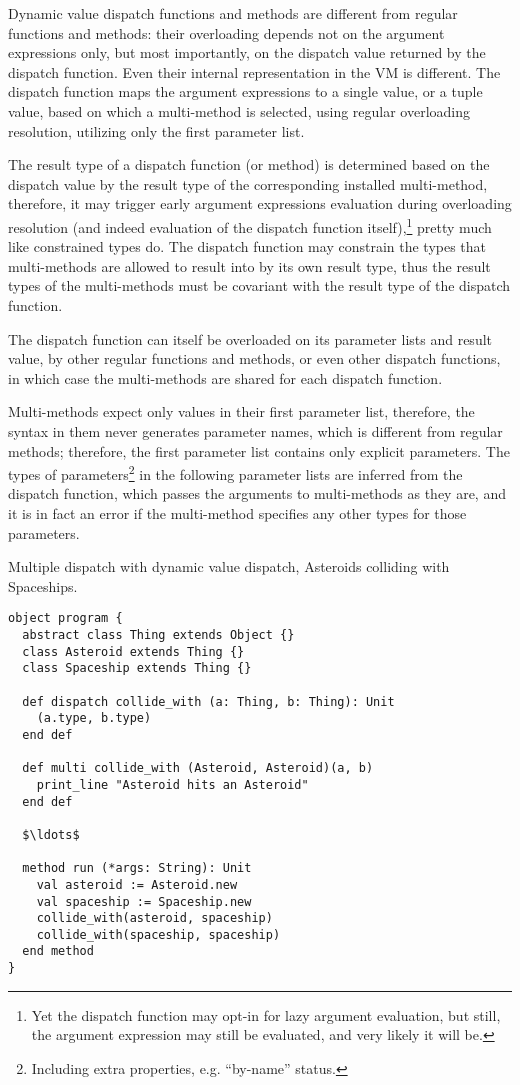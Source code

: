 Dynamic value dispatch functions and methods are different from regular functions and methods: their overloading depends not on the argument expressions only, but most importantly, on the dispatch value returned by the dispatch function. Even their internal representation in the VM is different. The dispatch function maps the argument expressions to a single value, or a tuple value, based on which a multi-method is selected, using regular overloading resolution, utilizing only the first parameter list. 

The result type of a dispatch function (or method) is determined based on the dispatch value by the result type of the corresponding installed multi-method, therefore, it may trigger early argument expressions evaluation during overloading resolution (and indeed evaluation of the dispatch function itself),\footnote{Yet the dispatch function may opt-in for lazy argument evaluation, but still, the argument expression may still be evaluated, and very likely it will be.} pretty much like constrained types do. The dispatch function may constrain the types that multi-methods are allowed to result into by its own result type, thus the result types of the multi-methods must be covariant with the result type of the dispatch function. 

The dispatch function can itself be overloaded on its parameter lists and result value, by other regular functions and methods, or even other dispatch functions, in which case the multi-methods are shared for each dispatch function. 

Multi-methods expect only values in their first parameter list, therefore, the syntax in them never generates parameter names, which is different from regular methods; therefore, the first parameter list contains only explicit parameters. The types of parameters\footnote{Including extra properties, e.g. ``by-name'' status.} in the following parameter lists are inferred from the dispatch function, which passes the arguments to multi-methods as they are, and it is in fact an error if the multi-method specifies any other types for those parameters. 

\example Multiple dispatch with dynamic value dispatch, Asteroids colliding with Spaceships.
\begin{lstlisting}
object program {
  abstract class Thing extends Object {}
  class Asteroid extends Thing {}
  class Spaceship extends Thing {}
  
  def dispatch collide_with (a: Thing, b: Thing): Unit
    (a.type, b.type)
  end def
  
  def multi collide_with (Asteroid, Asteroid)(a, b)
    print_line "Asteroid hits an Asteroid"
  end def
  
  $\ldots$
  
  method run (*args: String): Unit
    val asteroid := Asteroid.new
    val spaceship := Spaceship.new
    collide_with(asteroid, spaceship)
    collide_with(spaceship, spaceship)
  end method
}
\end{lstlisting}

